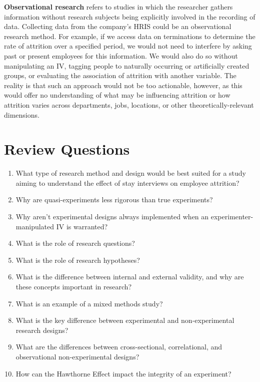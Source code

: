 \documentclass[]{book}
\begin{document}
\textbf{Observational research} refers to studies in which the researcher gathers information without research subjects being explicitly involved in the recording of data. Collecting data from the company's HRIS could be an observational research method. For example, if we access data on terminations to determine the rate of attrition over a specified period, we would not need to interfere by asking past or present employees for this information. We would also do so without manipulating an IV, tagging people to naturally occurring or artificially created groups, or evaluating the association of attrition with another variable. The reality is that such an approach would not be too actionable, however, as this would offer no understanding of what may be influencing attrition or how attrition varies across departments, jobs, locations, or other theoretically-relevant dimensions.

\hypertarget{review-questions-2}{%
\section{Review Questions}\label{review-questions-2}}

\begin{enumerate}
\def\labelenumi{\arabic{enumi}.}
\item
  What type of research method and design would be best suited for a study aiming to understand the effect of stay interviews on employee attrition?
\item
  Why are quasi-experiments less rigorous than true experiments?
\item
  Why aren't experimental designs always implemented when an experimenter-manipulated IV is warranted?
\item
  What is the role of research questions?
\item
  What is the role of research hypotheses?
\item
  What is the difference between internal and external validity, and why are these concepts important in research?
\item
  What is an example of a mixed methods study?
\item
  What is the key difference between experimental and non-experimental research designs?
\item
  What are the differences between cross-sectional, correlational, and observational non-experimental designs?
\item
  How can the Hawthorne Effect impact the integrity of an experiment?
\end{enumerate}
\end{document}
